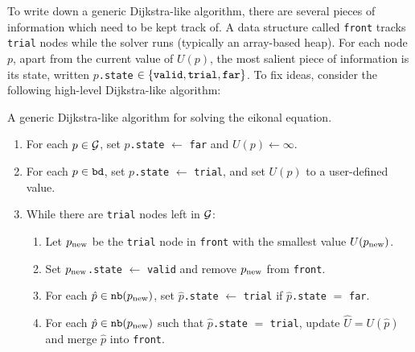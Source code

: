 \documentclass[smallcondensed]{svjour3}
\begin{document}
To write down a generic Dijkstra-like algorithm, there are several
pieces of information which need to be kept track of. A data structure
called \texttt{front} tracks \texttt{trial} nodes while the solver
runs (typically an array-based heap). For each node $p$, apart from
the current value of $U(p)$, the most salient piece of information is
its state, written $p$\texttt{.state}
$\in \left\{\texttt{valid}, \texttt{trial}, \texttt{far}\right\}$. To fix
ideas, consider the following high-level Dijkstra-like algorithm:

\begin{algorithm}
  \caption{A generic Dijkstra-like algorithm for solving the eikonal
    equation.}\label{alg:dijkstra-like}
  \begin{enumerate}[nolistsep]
  \item For each $p \in \mathcal{G}$, set $p$\texttt{.state} $\gets$
    \texttt{far} and $U(p) \gets \infty$.
  \item For each $p \in \texttt{bd}$, set $p$\texttt{.state} $\gets$
    \texttt{trial}, and set $U(p)$ to a user-defined value.
  \item While there are \texttt{trial} nodes left in $\mathcal{G}$:
    \begin{enumerate}[nolistsep]
    \item Let $p_{\operatorname{new}}$ be the \texttt{trial} node in \texttt{front}
      with the smallest value $U(p_{\operatorname{new}})$.\label{enum:get-node}
    \item Set $p_{\operatorname{new}}$\texttt{.state} $\gets$ \texttt{valid} and remove
      $p_{\operatorname{new}}$ from \texttt{front}.
    \item For each $\hat{p} \in \texttt{nb}(p_{\operatorname{new}})$, set
      $\hat{p}$\texttt{.state} $\gets$ \texttt{trial} if
      $\hat{p}$\texttt{.state} $=$ \texttt{far}.\label{enum:set-trial}
    \item For each $\hat{p} \in \texttt{nb}(p_{\operatorname{new}})$ such that
      $\hat{p}$\texttt{.state} $=$ \texttt{trial}, update
      $\hat{U} = U(\hat{p})$ and merge $\hat{p}$ into
      \texttt{front}.\label{enum:update-U}
    \end{enumerate}
  \end{enumerate}
\end{algorithm}
\end{document}
